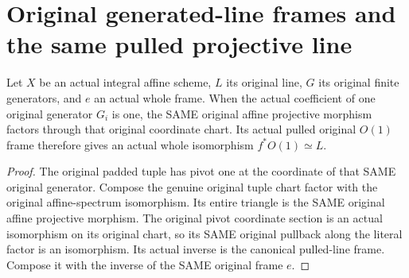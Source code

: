 \section{Original generated-line frames and the same pulled projective line}

\begin{definition}
\label{def:fc-generated-line-affine-twist-frame}
\leanok
{}
Let $X$ be an actual integral affine scheme, $L$ its original line,
$G$ its original finite generators, and $e$ an actual whole frame.
When the actual coefficient of one original generator $G_i$ is one,
the SAME original affine projective morphism factors through that
original coordinate chart. Its actual pulled original $O(1)$ frame
therefore gives an actual whole isomorphism $f^*O(1)\simeq L$.
\end{definition}
\begin{proof}
The original padded tuple has pivot one at the coordinate of that
SAME original generator. Compose the genuine original tuple chart
factor with the original affine-spectrum isomorphism. Its entire
triangle is the SAME original affine projective morphism. The original pivot coordinate section is an actual isomorphism on
its original chart, so its SAME original pullback along the literal
factor is an isomorphism. Its actual inverse is the canonical
pulled-line frame. Compose it with the inverse of the SAME original
frame $e$.
\end{proof}

